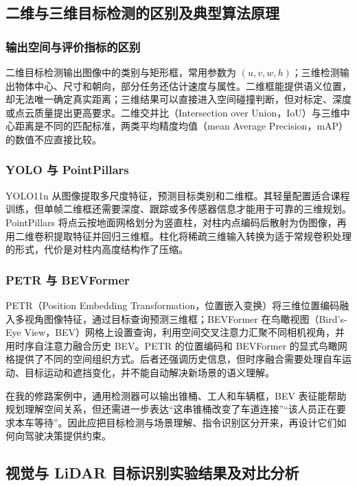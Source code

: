\documentclass[UTF8,zihao=-4,fontset=windows]{ctexart}
\begin{document}
\FloatBarrier
\subsection{二维与三维目标检测的区别及典型算法原理}
\subsubsection{输出空间与评价指标的区别}
二维目标检测输出图像中的类别与矩形框，常用参数为 $(u,v,w,h)$；三维检测输出物体中心、尺寸和朝向，部分任务还估计速度与属性。二维框能提供语义位置，却无法唯一确定真实距离；三维结果可以直接进入空间碰撞判断，但对标定、深度或点云质量提出更高要求。二维交并比（Intersection over Union，IoU）与三维中心距离是不同的匹配标准，两类平均精度均值（mean Average Precision，mAP）的数值不应直接比较。
\subsubsection{YOLO 与 PointPillars}
YOLO11n 从图像提取多尺度特征，预测目标类别和二维框。其轻量配置适合课程训练，但单帧二维框还需要深度、跟踪或多传感器信息才能用于可靠的三维规划。PointPillars 将点云按地面网格划分为竖直柱，对柱内点编码后散射为伪图像，再用二维卷积提取特征并回归三维框。柱化将稀疏三维输入转换为适于常规卷积处理的形式，代价是对柱内高度结构作了压缩。
\subsubsection{PETR 与 BEVFormer}
PETR（Position Embedding Transformation，位置嵌入变换）将三维位置编码融入多视角图像特征，通过目标查询预测三维框；BEVFormer 在鸟瞰视图（Bird's-Eye View，BEV）网格上设置查询，利用空间交叉注意力汇聚不同相机视角，并用时序自注意力融合历史 BEV。PETR 的位置编码和 BEVFormer 的显式鸟瞰网格提供了不同的空间组织方式。后者还强调历史信息，但时序融合需要处理自车运动、目标运动和遮挡变化，并不能自动解决新场景的语义理解。

在我的修路案例中，通用检测器可以输出锥桶、工人和车辆框，BEV 表征能帮助规划理解空间关系，但还需进一步表达“这串锥桶改变了车道连接”“该人员正在要求本车等待”。因此应把目标检测与场景理解、指令识别区分开来，再设计它们如何向驾驶决策提供约束。

\FloatBarrier
\subsection{视觉与 LiDAR 目标识别实验结果及对比分析}
\end{document}
